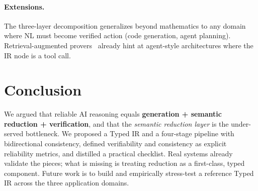 \documentclass[11pt]{article}
\begin{document}
\paragraph{Extensions.}
The three-layer decomposition generalizes beyond mathematics to any domain where NL
must become verified action (code generation, agent planning). Retrieval-augmented
provers~\cite{yang2023leandojo} already hint at agent-style architectures where the IR
node is a tool call.

\section{Conclusion}
\label{sec:conclusion}

We argued that reliable AI reasoning equals \textbf{generation + semantic reduction +
verification}, and that the \emph{semantic reduction layer} is the under-served
bottleneck. We proposed a Typed IR and a four-stage pipeline with bidirectional
consistency, defined verifiability and consistency as explicit reliability metrics, and
distilled a practical checklist. Real systems already validate the pieces; what is
missing is treating reduction as a first-class, typed component. Future work is to build
and empirically stress-test a reference Typed IR across the three application domains.



\end{document}
